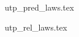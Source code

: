 \documentclass[11pt,a4paper]{article}
\begin{document}
% 




\newpage



\newpage



\newpage

 {utp_pred_laws.tex}

\newpage

 {utp_rel_laws.tex}



% 

%
%
\end{document}
